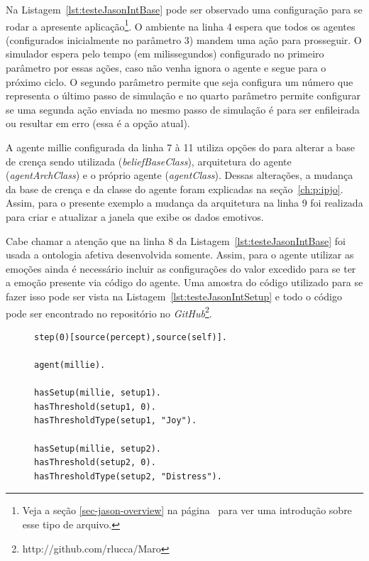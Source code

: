 Na Listagem~\ref{lst:testeJasonIntBase} pode ser observado uma configuração
para se rodar a apresente aplicação\footnote{Veja a seção
\ref{sec-jason-overview} na página~\pageref{sec-jason-overview}
para ver uma introdução sobre esse tipo de arquivo.}. O ambiente na linha 4
espera que todos os agentes (configurados inicialmente no parâmetro 3) mandem
uma ação para prosseguir. O simulador espera pelo tempo (em milissegundos)
configurado no primeiro parâmetro por essas ações, caso não venha ignora o
agente e segue para o próximo ciclo. O segundo parâmetro permite que seja
configura um número que representa o último passo de simulação e no quarto
parâmetro permite configurar se uma segunda ação enviada no mesmo passo de
simulação é para ser enfileirada ou resultar em erro (essa é a opção atual).

\begin{center}
    \begin{minipage}{130mm}
	\lstset{linewidth=130mm}
	
    \end{minipage}
\end{center}

A agente millie configurada da linha 7 à 11 utiliza opções do \jason para
alterar a base de crença sendo utilizada (\emph{beliefBaseClass}),
arquitetura do agente (\emph{agentArchClass}) e o próprio agente
(\emph{agentClass}). Dessas alterações, a mudança da base de crença e da
classe do agente foram explicadas na seção~\ref{ch:p:ipjo}. Assim, para o
presente exemplo a mudança da arquitetura na linha 9 foi realizada para criar
e atualizar a janela que exibe os dados emotivos.

Cabe chamar a atenção que na linha 8 da Listagem~\ref{lst:testeJasonIntBase}
foi usada a ontologia afetiva desenvolvida somente. Assim, para o agente
utilizar as emoções ainda é necessário incluir as configurações do valor
excedido para se ter a emoção presente via código do agente. Uma amostra do
código utilizado para se fazer isso pode ser vista na
Listagem~\ref{lst:testeJasonIntSetup} e todo o código pode ser encontrado no
repositório no \emph{GitHub}\footnote{http://github.com/rlucca/Maro}.

\lstset{linewidth=80mm}
\begin{figure}
	\begin{lstlisting}[frame=trbl,
caption=Parte do código do agente para aplicação interativa de teste,
label=lst:testeJasonIntSetup]
step(0)[source(percept),source(self)].

agent(millie).

hasSetup(millie, setup1).
hasThreshold(setup1, 0).
hasThresholdType(setup1, "Joy").

hasSetup(millie, setup2).
hasThreshold(setup2, 0).
hasThresholdType(setup2, "Distress").
	\end{lstlisting}
\end{figure}

